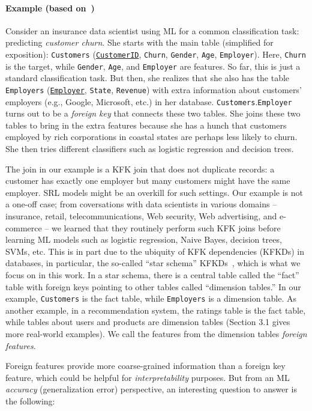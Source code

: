 \documentclass[sigconf]{acmart}
\begin{document}
\paragraph*{Example (based on~\cite{orion})}
Consider an insurance data scientist using ML for a common classification task: predicting \textit{customer churn}. She starts with the main table (simplified 
for exposition): \texttt{Customers} (\underline{\texttt{CustomerID}}, \texttt{Churn}, \texttt{Gender}, \texttt{Age}, \texttt{Employer}). 
Here, \texttt{Churn} is the target, while \texttt{Gender}, \texttt{Age}, and \texttt{Employer} are features. So far, this is just a standard classification task.  
But then, she realizes that she also has the table \texttt{Employers} (\underline{\texttt{Employer}}, \texttt{State}, \texttt{Revenue}) with extra information about customers' employers 
(e.g., Google, Microsoft, etc.) in her database. \texttt{Customers}.\texttt{Employer} turns out to be a \textit{foreign key} that connects these two tables. 
She joins these two tables to bring in the extra features because she has a hunch that customers employed by rich corporations in coastal states are perhaps 
less likely to churn. She then tries different classifiers such as logistic regression and decision trees.

The join in our example is a KFK join that does not duplicate records: a customer has exactly one employer but many customers might have the same employer.
SRL models might be an overkill for such settings. Our example is not a one-off case; 
from coversations with data scientists in various domains -- insurance, retail, telecommunications, Web security, Web advertising, and e-commerce -- 
we learned that they routinely perform such KFK joins before learning ML models such as logistic regression, Naive Bayes, decision trees, SVMs, etc. This is in part due to the
ubiquity of KFK dependencies (KFKDs) in databases, in particular, the so-called ``star schema'' KFKDs~\cite{cowbook}, which is what we focus on in this work. In a star schema,
there is a central table called the ``fact'' table with foreign keys pointing to other tables called ``dimension tables.'' In our example, \texttt{Customers} is the fact table, 
while \texttt{Employers} is a dimension table. As another example, in a recommendation system, the ratings table is the fact table, while tables about users and products are 
dimension tables (Section 3.1 gives more real-world examples). We call the features from the dimension tables \textit{foreign features}.

Foreign features provide more coarse-grained information than a foreign key feature, which could be helpful for \textit{interpretability} purposes. 
But from an ML \textit{accuracy} (generalization error) perspective, an interesting question to answer is the following: 
\end{document}
